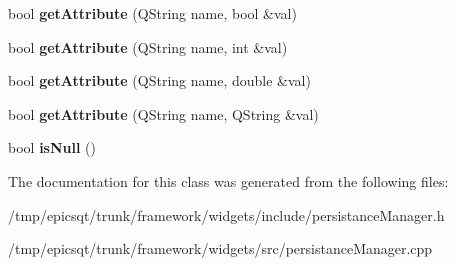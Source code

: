\begin{DoxyCompactItemize}
\item 
\hypertarget{classPMElement_a3aeee273dcfa62c36a94804d2d0be3a6}{
bool {\bfseries getAttribute} (QString name, bool \&val)}
\label{classPMElement_a3aeee273dcfa62c36a94804d2d0be3a6}

\item 
\hypertarget{classPMElement_a0957c8c16bc1fb6af400775576f8a2d9}{
bool {\bfseries getAttribute} (QString name, int \&val)}
\label{classPMElement_a0957c8c16bc1fb6af400775576f8a2d9}

\item 
\hypertarget{classPMElement_aab2c89af1d53fa4be12040ad4c83f6b2}{
bool {\bfseries getAttribute} (QString name, double \&val)}
\label{classPMElement_aab2c89af1d53fa4be12040ad4c83f6b2}

\item 
\hypertarget{classPMElement_a9da1b4466231bc98af036120847982e8}{
bool {\bfseries getAttribute} (QString name, QString \&val)}
\label{classPMElement_a9da1b4466231bc98af036120847982e8}

\item 
\hypertarget{classPMElement_acef70c97acb6e8403ddbf172c323fcdb}{
bool {\bfseries isNull} ()}
\label{classPMElement_acef70c97acb6e8403ddbf172c323fcdb}

\end{DoxyCompactItemize}


The documentation for this class was generated from the following files:\begin{DoxyCompactItemize}
\item 
/tmp/epicsqt/trunk/framework/widgets/include/persistanceManager.h\item 
/tmp/epicsqt/trunk/framework/widgets/src/persistanceManager.cpp\end{DoxyCompactItemize}
